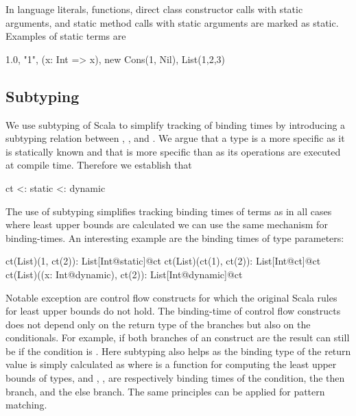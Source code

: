 In \tool language literals, functions, direct class constructor calls with static arguments, and static method
 calls with static arguments are marked as static. Examples of static terms are\begin{lstparagraph}
1.0, "1", (x: Int => x), new Cons(1, Nil), List(1,2,3)
\end{lstparagraph}

\subsection{Subtyping}
\label{sct:lub}

 We use subtyping of Scala to simplify tracking of binding times by introducing a
 subtyping relation between , , and . We argue that
 a  type is a more specific  as it is statically known
 and that  is more specific than  as its operations are executed
 at compile time. Therefore we establish that\begin{lstparagraph}
                 ct <: static <: dynamic
\end{lstparagraph}

 The use of subtyping simplifies tracking binding times of terms as in all cases
 where least upper bounds are calculated we can use the same mechanism for binding-times.
 An interesting example are the binding times of type parameters:\begin{lstparagraph}
ct(List)(1, ct(2)): List[Int@static]@ct
ct(List)(ct(1), ct(2)): List[Int@ct]@ct
ct(List)((x: Int@dynamic), ct(2)): List[Int@dynamic]@ct
\end{lstparagraph}

Notable exception are control flow constructs for which the original Scala rules for least
 upper bounds do not hold. The binding-time of control flow constructs does not
 depend only on the return type of the branches but also on the conditionals. For example, if
 both branches of an  construct are  the result can still be 
 if the condition is . Here subtyping also helps as the binding type of the
 return value is simply calculated as  where  is a function
 for computing the least upper bounds of types, and , ,  are respectively
 binding times of the condition, the then branch, and the else branch. The same principles can be applied for
 pattern matching.

